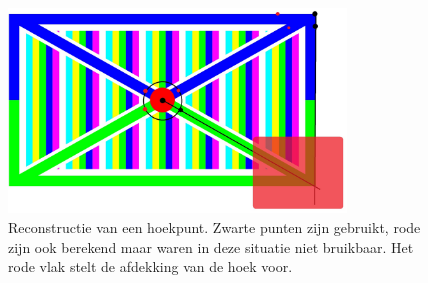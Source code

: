 		\begin{figure}[H]
			\center
			\includegraphics[width=0.8\textwidth]{img/screenReconstruction.jpg}
			\caption{Reconstructie van een hoekpunt. Zwarte punten zijn gebruikt, rode zijn ook berekend maar waren in deze situatie niet bruikbaar. Het rode vlak stelt de afdekking van de hoek voor.}
			\label{html}
			\label{scherm}
		\end{figure}
		
	